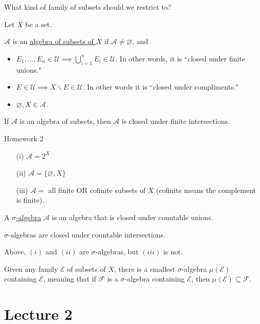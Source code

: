 \documentclass[x11names,reqno,14pt]{extarticle}
\begin{document}
What kind of family of subsets should we restrict to? 

Let $X$ be a set. 

 $\mathcal{A}$ is an \underline{algebra of subsets of $X$} if $\mathcal{A} \neq \varnothing$, and 
\begin{itemize}
\item 
\(
E_1, \dots, E_n \in \mathcal{U} \implies \bigcup_{i=1}^nE_i \in \mathcal{U}
\).
 In other words, it is ``closed under finite unions." 
\item
\(
E \in \mathcal{U} \implies X \backslash E \in \mathcal{U}
\). 
In other words it is ``closed under compliments."
\item 
\(
\varnothing, X \in \mathcal{A}
\). 
\end{itemize}

\lem 

If $\mathcal{A}$ is an algebra of subsets, then $\mathcal{A}$ is closed under finite intersections.

\proof 

Homework 2

\exm

\begin{itemize}
\item[(i)] $\mathcal{A} = 2^X$
\item[(ii)] $\mathcal{A} = \{\varnothing, X\}$
\item[(iii)] $\mathcal{A} =$ all finite OR cofinite subsets of $X$ (cofinite means the complement is finite). 
\end{itemize}

 A \underline{$\sigma$-algebra} $\mathcal{A}$ is an algebra that is closed under countable unions. 

\rem

$\sigma$-algebras are closed under countable intersections. 

\exm

Above, $(i)$ and $(ii)$ are $\sigma$-algebras, but $(iii)$ is not. 

\prop

Given any family $\mathcal{E}$ of subsets of $X$, there is a smallest $\sigma$-algebra $\mu(\mathcal{E})$ containing $\mathcal{E}$, meaning that if $\mathcal{F}$ is a $\sigma$-algebra containing $\mathcal{E}$, then $\mu(\mathcal{E}) \subseteq \mathcal{F}$. 


\section*{Lecture 2}
\end{document}
